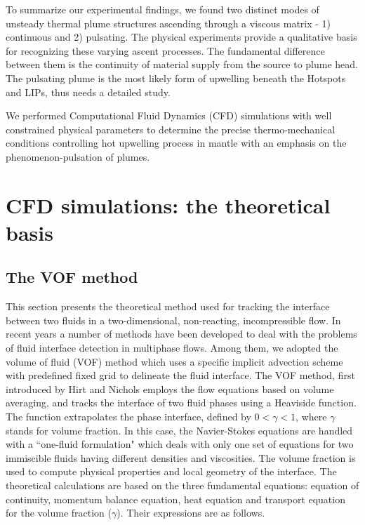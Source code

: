 \documentclass[12pt]{article}
\begin{document}
To summarize our experimental findings, we found two distinct modes of unsteady thermal plume structures ascending through a viscous matrix - 1) continuous and 2) pulsating. The physical experiments provide a qualitative basis for recognizing these varying ascent processes. The fundamental difference between them is the continuity of material supply from the source to plume head. The pulsating plume is the most likely form of upwelling beneath the Hotspots and LIPs, thus needs a detailed study. 



We performed Computational Fluid Dynamics (CFD) simulations with well constrained physical parameters to determine the precise thermo-mechanical conditions controlling hot upwelling process in mantle with an emphasis on the phenomenon-pulsation of plumes.  



\section{CFD simulations: the theoretical basis }
\label{sec:cfd} 
 
\subsection{The VOF method}
\label{sec:vof}


This section presents the theoretical method used for tracking the interface between two fluids in a two-dimensional, non-reacting, incompressible flow. In recent years a number of methods have been developed to deal with the problems of fluid interface detection in multiphase flows. Among them, we adopted the volume of fluid (VOF) method which uses a specific implicit advection scheme with predefined fixed grid to delineate the fluid interface. The VOF method, first introduced by Hirt and Nichols \cite{hirt1981volume} employs the flow equations based on volume averaging, and tracks the interface of two fluid phases using a Heaviside function. The function extrapolates the phase interface, defined by $0 < \gamma < 1$, where $\gamma$ stands for volume fraction. In this case, the Navier-Stokes equations are handled with a ``one-fluid formulation" which deals with only one set of equations for two immiscible fluids having different densities and viscosities.  The volume fraction is used to compute physical properties and local geometry of the interface. The theoretical calculations are based on the three fundamental equations: equation of continuity, momentum balance equation, heat equation and  transport equation for the volume fraction ($\gamma$). Their expressions are as follows.
\end{document}
